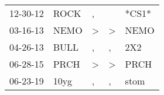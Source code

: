 \begin{supertabular}{lllll}
 12-30-12 &  ROCK &             , &               &  *CS1* \\
 03-16-13 &  NEMO &  \textgreater &  \textgreater &   NEMO \\
 04-26-13 &  BULL &             , &             , &    2X2 \\
 06-28-15 &  PRCH &  \textgreater &  \textgreater &   PRCH \\
 06-23-19 &  10yg &             , &             , &   stom \\
\end{supertabular}
